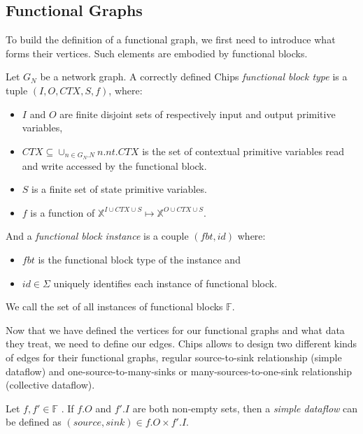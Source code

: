 \documentclass[runningheads]{llncs}
\newcommand{\F}{\mathbb{F}}
\begin{document}
\subsection{Functional Graphs}
\label{sec:functionalgraphs}

To build the definition of a functional graph, we first need to introduce what forms their vertices. Such elements are embodied by functional blocks.

\begin{definition}\label{def:FunctionalBlock}
    Let $G_N$ be a network graph. A correctly defined Chips \emph{functional block type} is a tuple $(I, O, CTX, S, f)$, where:
    \begin{itemize}
        \item $I$ and $O$ are finite disjoint sets of respectively input and output primitive variables,
        \item $CTX \subseteq \cup_{n \in G_N.N} n.nt.CTX$ is the set of contextual primitive variables read and write accessed by the functional block.
        \item $S$ is a finite set of state primitive variables.
        \item $f$ is a function of $\mathbb{X}^{I \cup CTX \cup S} \mapsto \mathbb{X}^{O \cup CTX \cup S}$.
    \end{itemize}
    And a \emph{functional block instance} is a couple $(fbt, id)$ where:
    \begin{itemize}
        \item $fbt$ is the functional block type of the instance and
        \item $id\in\Sigma$ uniquely identifies each instance of functional block. 
    \end{itemize}
    We call the set of all instances of functional blocks $\F$.
\end{definition}

Now that we have defined the vertices for our functional graphs and what data they treat, we need to define our edges. Chips allows to design two different kinds of edges for their functional graphs, regular source-to-sink relationship (simple dataflow) and one-source-to-many-sinks or many-sources-to-one-sink relationship (collective dataflow).

\begin{definition}\label{def:SimplDataflow}
    Let $f,f' \in \F$ . If $f.O$ and $f'.I$ are both non-empty sets, then a \emph{simple dataflow} can be defined as $(source,sink) \in f.O \times f'.I$.
\end{definition}
\end{document}
